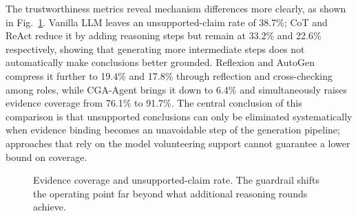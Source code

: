\documentclass[journal,10pt,a4paper]{IEEEtran}
\begin{document}
\begin{table}[t]
\caption{Aggregate Results (Mean over Three Random Seeds). Best values in bold.}
\label{tab:main}
\centering
\footnotesize
{}
\end{table}

The trustworthiness metrics reveal mechanism differences more clearly, as shown in Fig.~\ref{fig:ecucr}. Vanilla LLM leaves an unsupported-claim rate of 38.7\%; CoT and ReAct reduce it by adding reasoning steps but remain at 33.2\% and 22.6\% respectively, showing that generating more intermediate steps does not automatically make conclusions better grounded. Reflexion and AutoGen compress it further to 19.4\% and 17.8\% through reflection and cross-checking among roles, while CGA-Agent brings it down to 6.4\% and simultaneously raises evidence coverage from 76.1\% to 91.7\%. The central conclusion of this comparison is that unsupported conclusions can only be eliminated systematically when evidence binding becomes an unavoidable step of the generation pipeline; approaches that rely on the model volunteering support cannot guarantee a lower bound on coverage.

\begin{figure}[t]
\centering
{}
\caption{Evidence coverage and unsupported-claim rate. The guardrail shifts the operating point far beyond what additional reasoning rounds achieve.}
\label{fig:ecucr}
\end{figure}
\end{document}
